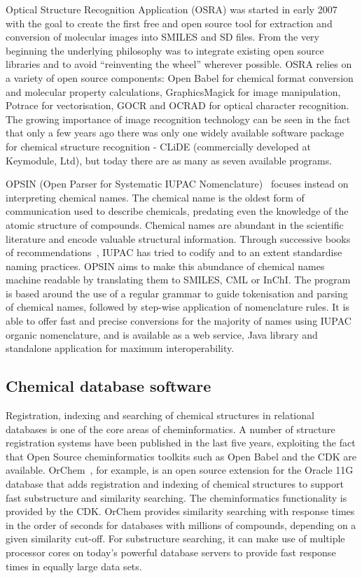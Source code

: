 \documentclass[10pt]{bmc_article}
\newenvironment{bmcformat}{\fussy\setboolean{publ}{true}}{\fussy}
\begin{document}
\begin{bmcformat}
Optical Structure Recognition Application (OSRA) \cite{WebOSRA} was started
in early 2007 with the goal to create the first free and open source
tool for extraction and conversion of molecular images into SMILES and
SD files. From the very beginning the underlying philosophy was to integrate
existing open source libraries and to avoid ``reinventing the wheel''
wherever possible. OSRA relies on a variety of open source components:
Open Babel for chemical format
conversion and molecular property calculations, GraphicsMagick for image
manipulation, Potrace for vectorisation, GOCR and OCRAD for optical
character recognition. The growing importance of image
recognition technology can be seen in the fact that
only a few years ago there was only one widely available software
package for chemical structure recognition -  CLiDE (commercially
developed at Keymodule, Ltd), but today there are as many as seven
available programs.

OPSIN (Open Parser for Systematic IUPAC
Nomenclature)~\cite{lowe_chemical_2011} focuses instead on interpreting chemical names.
The chemical name is the oldest form of communication used to
describe chemicals, predating
even the knowledge of the atomic structure of compounds.
Chemical names are abundant in the scientific
literature and encode valuable structural information.
Through successive books of
recommendations~\cite{iupac_nomenclature_1979, iupac_guide_1993},
IUPAC has tried to codify and to an extent standardise naming practices.
OPSIN aims to make this abundance of
chemical names machine readable by translating them to SMILES, CML or
InChI. The program is based around the use of a regular grammar to
guide tokenisation and parsing of chemical names, followed by
step-wise application of nomenclature rules. It is able to offer
fast and precise conversions for the majority of names using IUPAC
organic nomenclature, and is available as a web service, Java
library and standalone application for maximum interoperability.

\subsection*{Chemical database software}

Registration, indexing and searching of chemical structures in
relational databases is one of the core areas of cheminformatics.
A number of structure registration systems have been published in the last five years, exploiting the fact that
Open Source cheminformatics toolkits such as Open Babel and the CDK
are available.
OrChem~\cite{RijnbeekS10}, for example, is an open source extension for the Oracle 11G database that
adds registration and indexing of chemical structures to support fast
substructure and similarity searching. The cheminformatics
functionality is provided by the CDK. OrChem
provides similarity searching with response times in the order of
seconds for databases with millions of compounds, depending on a given
similarity cut-off. For substructure searching, it can make use of
multiple processor cores on today's powerful database servers to
provide fast response times in equally large data sets.


\end{bmcformat}
\end{document}
